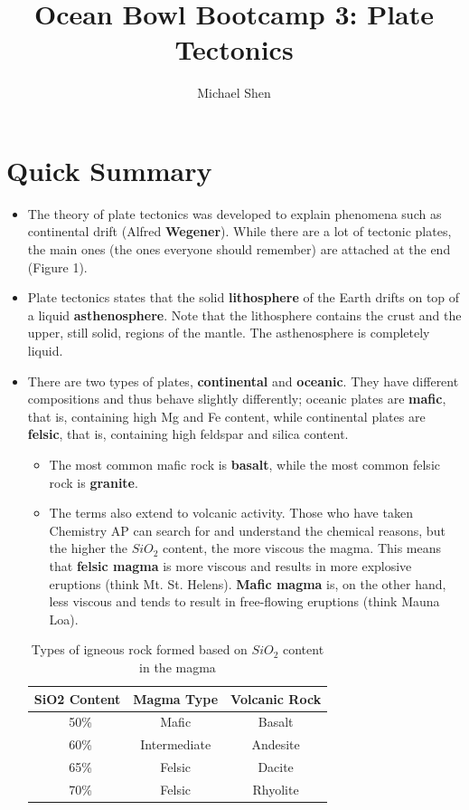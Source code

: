 \documentclass{article}
\begin{document}
\title{Ocean Bowl Bootcamp 3: Plate Tectonics}
\author{Michael Shen}
\maketitle

\section{Quick Summary}

\begin{itemize}
	\item The theory of plate tectonics was developed to explain phenomena such as continental drift (Alfred \textbf{Wegener}). While there are a lot of tectonic plates, the main ones (the ones everyone should remember) are attached at the end (Figure 1).
	
	\item Plate tectonics states that the solid \textbf{lithosphere} of the Earth drifts on top of a liquid \textbf{asthenosphere}. Note that the lithosphere contains the crust and the upper, still solid, regions of the mantle. The asthenosphere is completely liquid.
	
	\item There are two types of plates, \textbf{continental} and \textbf{oceanic}. They have different compositions and thus behave slightly differently; oceanic plates are \textbf{mafic}, that is, containing high Mg and Fe content, while continental plates are \textbf{felsic}, that is, containing high feldspar and silica content. 
	
	
	\begin{itemize}
		\item The most common mafic rock is \textbf{basalt}, while the most common felsic rock is \textbf{granite}.
		\item The terms also extend to volcanic activity. Those who have taken Chemistry AP can search for and understand the chemical reasons, but the higher the $SiO_2$ content, the more viscous the magma. This means that \textbf{felsic magma} is more viscous and results in more explosive eruptions (think Mt. St. Helens). \textbf{Mafic magma} is, on the other hand, less viscous and tends to result in free-flowing eruptions (think Mauna Loa).
	\end{itemize}
	
	
	\begin{table}[h]
	\centering
		\begin{tabular}{c|c|c}
		\textbf{SiO2 Content} & \textbf{Magma Type} & \textbf{Volcanic Rock} \\ \hline
		~50\% & Mafic & Basalt \\
		~60\% & Intermediate & Andesite \\
		~65\% & Felsic & Dacite \\
		~70\% & Felsic & Rhyolite
		\end{tabular}
		\caption{Types of igneous rock formed based on $SiO_2$ content in the magma}
	\end{table}
	

\end{itemize}
\end{document}
